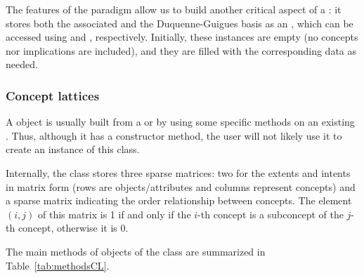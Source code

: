 The features of the  paradigm allow us to build another critical
aspect of a : it stores both the associated
 and the Duquenne-Guigues basis as an
, which can be accessed using 
and , respectively. Initially, these instances
are empty (no concepts nor implications are included), and they are
filled with the corresponding data as needed.

\hypertarget{concept-lattices}{%
\subsubsection{Concept lattices}\label{concept-lattices}}

A  object is usually built from a
 or by using some specific methods on an existing
. Thus, although it has a constructor method, the
user will not likely use it to create an instance of this class.

Internally, the  class stores three sparse
matrices: two for the extents and intents in matrix form (rows are
objects/attributes and columns represent concepts) and a sparse matrix
indicating the order relationship between concepts. The element
\((i, j)\) of this matrix is 1 if and only if the \(i\)-th concept is a
subconcept of the \(j\)-th concept, otherwise it is 0.

The main methods of objects of the  class are
summarized in Table~\ref{tab:methodsCL}.

